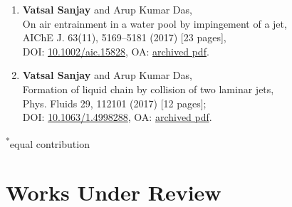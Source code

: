 \documentclass[11pt,a4paper,roman,english,colorlinks,linkcolor={red!50!black}]{moderncv}
\begin{document}
\begin{enumerate}[leftmargin=0.75cm]
	\item \textbf{Vatsal Sanjay} and Arup Kumar Das,\\
	On air entrainment in a water pool by impingement of a jet,\\
	AIChE J. 63(11), 5169--5181  (2017) [23 pages],\\
	DOI: \href{https://doi.org/10.1002/aic.15828}{10.1002/aic.15828}, OA: \href{https://tinyurl.com/24ne4oql}{archived pdf}.

	\item \textbf{Vatsal Sanjay} and Arup Kumar Das,\\
	Formation of liquid chain by collision of two laminar jets,\\
	Phys. Fluids 29, 112101  (2017) [12 pages];\\
	DOI: \href{https://doi.org/10.1063/1.4998288}{10.1063/1.4998288}, OA: \href{https://tinyurl.com/27sd7lgo}{archived pdf}.

\end{enumerate}

\footnotesize
\textsuperscript{*}equal contribution
\normalsize

\section{\textbf{Works Under Review}}
\end{document}
